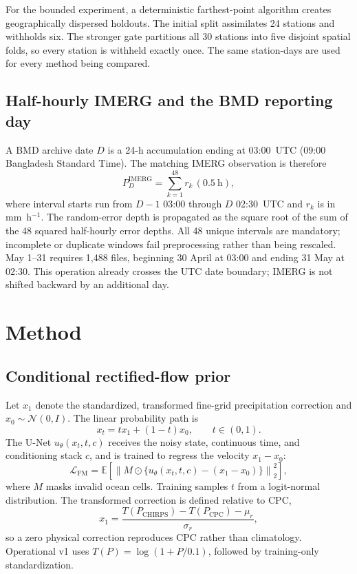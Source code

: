 \documentclass[10pt,twocolumn]{article}
\begin{document}
For the bounded experiment, a deterministic farthest-point algorithm creates geographically dispersed holdouts. The initial split assimilates 24 stations and withholds six. The stronger gate partitions all 30 stations into five disjoint spatial folds, so every station is withheld exactly once. The same station-days are used for every method being compared.

\subsection{Half-hourly IMERG and the BMD reporting day}

A BMD archive date $D$ is a 24-h accumulation ending at 03:00~UTC (09:00 Bangladesh Standard Time). The matching IMERG observation is therefore
\begin{equation}
 P_D^{\mathrm{IMERG}} = \sum_{k=1}^{48} r_k\,(0.5~\mathrm{h}),
 \label{eq:imergsum}
\end{equation}
where interval starts run from $D-1$ 03:00 through $D$ 02:30~UTC and $r_k$ is in mm~h$^{-1}$. The random-error depth is propagated as the square root of the sum of the 48 squared half-hourly error depths. All 48 unique intervals are mandatory; incomplete or duplicate windows fail preprocessing rather than being rescaled. May 1--31 requires 1,488 files, beginning 30 April at 03:00 and ending 31 May at 02:30. This operation already crosses the UTC date boundary; IMERG is not shifted backward by an additional day.

\section{Method}

\subsection{Conditional rectified-flow prior}

Let $x_1$ denote the standardized, transformed fine-grid precipitation correction and $x_0\sim\mathcal{N}(0,I)$. The linear probability path is
\begin{equation}
 x_t = t x_1 + (1-t)x_0, \qquad t\in(0,1).
 \label{eq:path}
\end{equation}
The U-Net $u_\theta(x_t,t,c)$ receives the noisy state, continuous time, and conditioning stack $c$, and is trained to regress the velocity $x_1-x_0$:
\begin{equation}
 \mathcal{L}_{\mathrm{FM}}=
 \mathbb{E}\left[\left\|M\odot\{u_\theta(x_t,t,c)-(x_1-x_0)\}\right\|_2^2\right],
 \label{eq:flowloss}
\end{equation}
where $M$ masks invalid ocean cells. Training samples $t$ from a logit-normal distribution. The transformed correction is defined relative to CPC,
\begin{equation}
 x_1 = \frac{T(P_{\mathrm{CHIRPS}})-T(P_{\mathrm{CPC}})-\mu_r}{\sigma_r},
 \label{eq:residual}
\end{equation}
so a zero physical correction reproduces CPC rather than climatology. Operational v1 uses $T(P)=\log(1+P/0.1)$, followed by training-only standardization.
\end{document}
